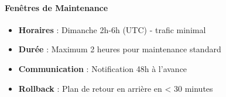 \paragraph{Fenêtres de Maintenance}
\begin{itemize}
    \item \textbf{Horaires} : Dimanche 2h-6h (UTC) - trafic minimal
    \item \textbf{Durée} : Maximum 2 heures pour maintenance standard
    \item \textbf{Communication} : Notification 48h à l'avance
    \item \textbf{Rollback} : Plan de retour en arrière en < 30 minutes
\end{itemize}